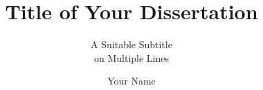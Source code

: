 \documentclass[utrecht]{lotdiss}
\title{Title of Your Dissertation}
\subtitle{A Suitable Subtitle\\on Multiple Lines}
\author{Your Name}
\begin{document}
\FrontMatter



\MainMatter  %








%
%

\BackMatter

%
%





\end{document}
